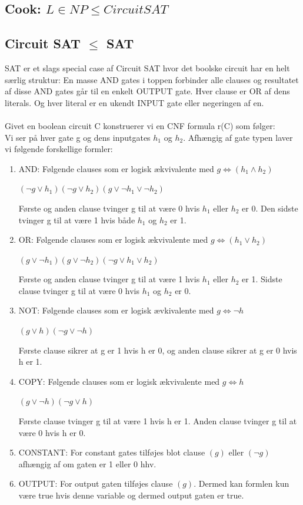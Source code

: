 \documentclass{article}
\begin{document}
\subsection{Cook: $L \in NP \le Circuit SAT$}
\subsection{Circuit SAT $\le$ SAT}
SAT er et slags special case af Circuit SAT hvor det boolske circuit har en helt særlig struktur: En masse AND gates i toppen forbinder alle clauses og resultatet af disse AND gates går til en enkelt OUTPUT gate. Hver clause er OR af dens literals. Og hver literal er en ukendt INPUT gate eller negeringen af en.\\\\
Givet en boolean circuit C konstruerer vi en CNF formula r(C) som følger:\\
Vi ser på hver gate g og dens inputgates $h_1$ og $h_2$. Afhængig af gate typen laver vi følgende forskellige formler:
\begin{enumerate}
	\item AND: Følgende clauses som er logisk ækvivalente med $g \iff (h_1 \land h_2)$
	\begin{center}
		$(\lnot g \lor h_1)(\lnot g \lor h_2)(g \lor \lnot h_1 \lor \lnot h_2)$
	\end{center}
	 Første og anden clause tvinger g til at være 0 hvis $h_1$ eller $h_2$ er 0. Den sidste tvinger g til at være 1 hvis både $h_1$ og $h_2$ er 1.
	\item OR: Følgende clauses som er logisk ækvivalente med $g \iff (h_1 \lor h_2)$
	\begin{center}
		$(g \lor \lnot h_1)(g \lor \lnot h_2)(\lnot g \lor  h_1 \lor h_2)$
	\end{center}
	Første og anden clause tvinger g til at være 1 hvis $h_1$ eller $h_2$ er 1. Sidste clause tvinger g til at være 0 hvis $h_1$ og $h_2$ er 0.
	\item NOT: Følgende clauses som er logisk ævkivalente med $g \iff \lnot h$
	\begin{center}
		$(g \lor h)(\lnot g \lor \lnot h)$
	\end{center}
	Første clause sikrer at g er 1 hvis h er 0, og anden clause sikrer at g er 0 hvis h er 1.
	\item COPY: Følgende clauses som er logisk ækvivalente med $g \iff h$
	\begin{center}
		$(g \lor  \lnot h)(\lnot g \lor h)$
	\end{center}
	Første clause tvinger g til at være 1 hvis h er 1. Anden clause tvinger g til at være 0 hvis h er 0.
	\item CONSTANT: For constant gates tilføjes blot clause $(g)$ eller $(\lnot g)$ afhængig af om gaten er 1 eller 0 hhv. 
	\item OUTPUT: For output gaten tilføjes clause $(g)$. Dermed kan formlen kun være true hvis denne variable og dermed output gaten er true.
\end{enumerate}
\end{document}
